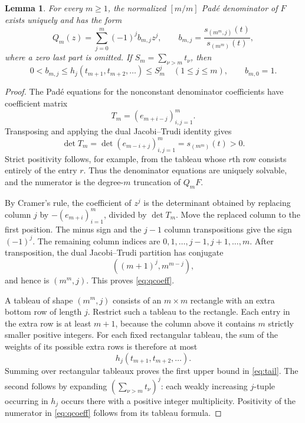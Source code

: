 \documentclass[11pt]{article}
\newtheorem{lemma}[theorem]{Lemma}
\theoremstyle{remark}\newtheorem{remark}[theorem]{Remark}
\begin{document}
\begin{lemma}\label{lem:schur}
For every $m\geq1$, the normalized $[m/m]$ Pad\'e denominator of $F$ exists uniquely and has the form
\begin{equation}\label{eq:qcoeff}
Q_m(z)=\sum_{j=0}^m(-1)^j b_{m,j}z^j,
\qquad
b_{m,j}=\frac{s_{(m^m,j)}(t)}{s_{(m^m)}(t)},
\end{equation}
where a zero last part is omitted. If $S_m=\sum_{\nu>m}t_\nu$, then
\begin{equation}\label{eq:tail}
0<b_{m,j}\leq h_j(t_{m+1},t_{m+2},\ldots)\leq S_m^j
\quad(1\leq j\leq m),\qquad b_{m,0}=1.
\end{equation}
\end{lemma}
\begin{proof}
The Pad\'e equations for the nonconstant denominator coefficients have coefficient matrix
\[
T_m=(e_{m+i-j})_{i,j=1}^m.
\]
Transposing and applying the dual Jacobi--Trudi identity gives
\[
\det T_m=\det(e_{m-i+j})_{i,j=1}^m=s_{(m^m)}(t)>0.
\]
Strict positivity follows, for example, from the tableau whose $r$th row consists entirely of the entry $r$. Thus the denominator equations are uniquely solvable, and the numerator is the degree-$m$ truncation of $Q_mF$.

By Cramer's rule, the coefficient of $z^j$ is the determinant obtained by replacing column $j$ by $-(e_{m+i})_{i=1}^m$, divided by $\det T_m$. Move the replaced column to the first position. The minus sign and the $j-1$ column transpositions give the sign $(-1)^j$. The remaining column indices are $0,1,\ldots,j-1,j+1,\ldots,m$. After transposition, the dual Jacobi--Trudi partition has conjugate
\[
((m+1)^j,m^{m-j}),
\]
and hence is $(m^m,j)$. This proves \eqref{eq:qcoeff}.

A tableau of shape $(m^m,j)$ consists of an $m\times m$ rectangle with an extra bottom row of length $j$. Restrict such a tableau to the rectangle. Each entry in the extra row is at least $m+1$, because the column above it contains $m$ strictly smaller positive integers. For each fixed rectangular tableau, the sum of the weights of its possible extra rows is therefore at most
\[
h_j(t_{m+1},t_{m+2},\ldots).
\]
Summing over rectangular tableaux proves the first upper bound in \eqref{eq:tail}. The second follows by expanding $(\sum_{\nu>m}t_\nu)^j$: each weakly increasing $j$-tuple occurring in $h_j$ occurs there with a positive integer multiplicity. Positivity of the numerator in \eqref{eq:qcoeff} follows from its tableau formula.
\end{proof}
\end{document}
